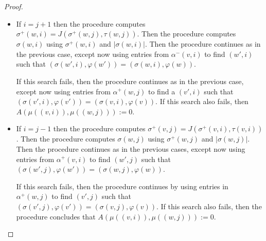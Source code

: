 \documentclass[twoside,leqno]{article}
\begin{document}
\begin{proof}
\begin{itemize}
          If this test fails for each of the entries in the second part of $\alpha(v,i)$, then the procedure concludes that $w\not\in X_{v,i}$ or $(w,i)\not\in N_G((v,i))$.  This still leaves the possibility that $v\in X_{w,i}$ and $(v,i)\in N_G((w,j))$.  The procedure checks this in exactly the same manner, but with the roles of $\mu(v,i)$ and $\mu(w,j)$ reversed.  If this test also fails to return a result, then $A(\mu((v,i)),\mu((w,j))):=0$.

    \item If $i=j+1$ then the procedure computes $\sigma^+(w,i)=J(\sigma^+(w,j),\tau(w,j))$. Then the procedure computes $\sigma(w,i)$ using $\sigma^+(w,i)$ and $|\sigma(w,i)|$. Then the procedure continues as in the previous case, except now using entries from $\alpha^-(v,i)$ to find $(w',i)$ such that $(\sigma(w',i),\varphi(w'))=(\sigma(w,i),\varphi(w))$.

          If this search fails, then the procedure continues as in the previous case, except now using entries from $\alpha^+(w,j)$ to find a $(v',i)$ such that $(\sigma(v',i),\varphi(v'))=(\sigma(v,i),\varphi(v))$.  If this search also fails, then $A(\mu((v,i)),\mu((w,j))):=0$.

    \item If $i=j-1$ then the procedure computes $\sigma^+(v,j)=J(\sigma^+(v,i),\tau(v,i))$. Then the procedure computes $\sigma(w,j)$ using $\sigma^+(w,j)$ and $|\sigma(w,j)|$. Then the procedure continues as in the previous cases, except now using entries from $\alpha^+(v,i)$ to find $(w',j)$ such that $(\sigma(w',j),\varphi(w'))=(\sigma(w,j),\varphi(w))$.

          If this search fails, then the procedure continues by using entries in $\alpha^+(w,j)$ to find $(v',j)$ such that $(\sigma(v',j),\varphi(v'))=(\sigma(v,j),\varphi(v))$.  If this search also fails, then the procedure concludes that $A(\mu((v,i)),\mu((w,j))):=0$.
  \end{itemize}


\end{proof}
\end{document}

